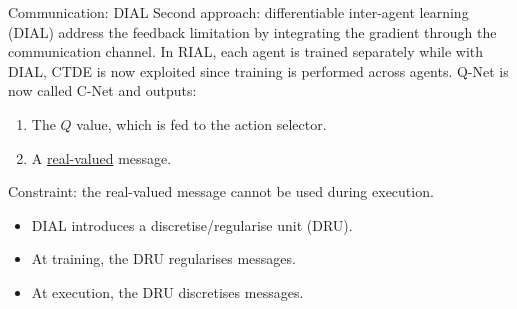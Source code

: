 \documentclass{beamer}
\begin{document}
\begin{frame}{Communication: DIAL}
Second approach: differentiable inter-agent learning (DIAL) address the feedback limitation by integrating the gradient through the communication channel.
\vfill
In RIAL, each agent is trained separately while with DIAL, CTDE is now exploited since training is performed across agents.
\vfill
Q-Net is now called C-Net and outputs:
\begin{enumerate}
    \item The $Q$ value, which is fed to the action selector.
    \item A \underline{real-valued} message.
\end{enumerate}
\vfill
Constraint: the real-valued message cannot be used during execution.
\begin{itemize}
    \item DIAL introduces a discretise/regularise unit (DRU).
    \item At training, the DRU regularises messages.
    \item At execution, the DRU discretises messages.
\end{itemize}

    
\end{frame}
\end{document}

